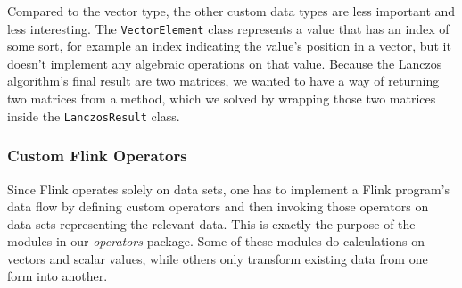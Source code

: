 
Compared to the vector type, the other custom data types are less important and
less interesting. The \texttt{VectorElement} class represents a value that has
an index of some sort, for example an index indicating the value's position in
a vector, but it doesn't implement any algebraic operations on that value.
Because the Lanczos algorithm's final result are two matrices, we wanted to
have a way of returning two matrices from a method, which we solved by wrapping
those two matrices inside the \texttt{LanczosResult} class.


\subsubsection{Custom Flink Operators}

Since Flink operates solely on data sets, one has to implement a Flink
program's data flow by defining custom operators and then invoking those
operators on data sets representing the relevant data. This is exactly the
purpose of the modules in our \textit{operators} package. Some of these modules
do calculations on vectors and scalar values, while others only transform
existing data from one form into another.


